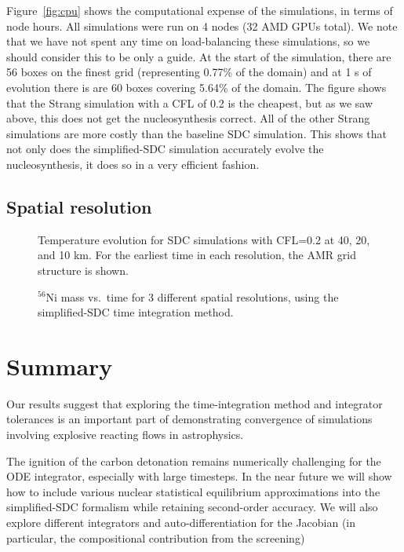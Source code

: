 \documentclass[modern]{aastex631}
\newcommand{\isot}[2]{$^{#2}\mathrm{#1}$}
\newcommand{\MarginPar}[1]{
    \marginpar{\vskip-\baselineskip%
               \raggedright%
               \tiny\sffamily%
               {\color{red}\hrule%
               \smallskip%
               #1\par%
               \smallskip%
               \hrule}}%
}
\begin{document}
Figure~\ref{fig:cpu} shows the computational expense of the
simulations, in terms of node hours.  All simulations were run on 4
nodes (32 AMD GPUs total).  We note that we have not spent any time on
load-balancing these simulations, so we should consider this to be
only a guide.  At the start of the simulation, there are 56 boxes on
the finest grid (representing 0.77\% of the domain) and at 1 s of
evolution there is are 60 boxes covering 5.64\% of the domain.  The
figure shows that the Strang simulation with a CFL of 0.2 is the
cheapest, but as we saw above, this does not get the nucleosynthesis
correct.  All of the other Strang simulations are more costly than the
baseline SDC simulation.  This shows that not only does the
simplified-SDC simulation accurately evolve the nucleosynthesis, it
does so in a very efficient fashion.

\subsection{Spatial resolution}

\begin{figure}[t]
\centering
{}
\caption{\label{fig:res_panel} Temperature evolution for SDC simulations with CFL=0.2 at 40, 20, and 10 km.  For the earliest time
  in each resolution, the AMR grid structure is shown.}
\end{figure}


\begin{figure}[t]
\centering
{}
\caption{\label{fig:res} \isot{Ni}{56} mass vs.\ time for 3 different spatial resolutions, using the simplified-SDC time integration method.}
\end{figure}




\section{Summary}

Our results suggest that exploring the time-integration method and
integrator tolerances is an important part of demonstrating
convergence of simulations involving explosive reacting flows in
astrophysics.

The ignition of the carbon detonation remains numerically challenging
for the ODE integrator, especially with large
timesteps.  \MarginPar{add some info on why it fails} In the near
future we will show how to include various nuclear statistical
equilibrium approximations into the simplified-SDC formalism while
retaining second-order accuracy.  We will also explore different
integrators and auto-differentiation for the Jacobian (in particular,
the compositional contribution from the screening)
\end{document}
